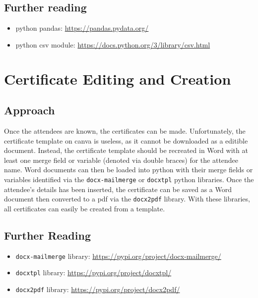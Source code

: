 \documentclass[11pt]{article}
\begin{document}
\subsection{Further reading}

\begin{itemize}
    \item \Gls{python} pandas: \url{https://pandas.pydata.org/}
    \item \Gls{python} \acrshort{csv} module: \url{https://docs.python.org/3/library/csv.html}
\end{itemize}

\newpage

\section{Certificate Editing and Creation}

\subsection{Approach}

Once the attendees are known, the certificates can be made. Unfortunately, the certificate template on \Gls{canva} is useless, as it cannot be downloaded as a editible document. Instead, the certificate template should be recreated in Word with at least one merge field or variable (denoted via double braces) for the attendee name. Word documents can then be loaded into \Gls{python} with their merge fields or variables identified via the \texttt{docx-mailmerge} or \texttt{docxtpl} \Gls{python} libraries. Once the attendee's details has been inserted, the certificate can be saved as a Word document then converted to a \acrshort{pdf} via the \texttt{docx2pdf} \gls{library}. With these libraries, all certificates can easily be created from a template.

\subsection{Further Reading}

\begin{itemize}
    \item \texttt{docx-mailmerge} \gls{library}: \url{https://pypi.org/project/docx-mailmerge/}
    \item \texttt{docxtpl} \gls{library}: \url{https://pypi.org/project/docxtpl/}
    \item \texttt{docx2pdf} \gls{library}: \url{https://pypi.org/project/docx2pdf/}
\end{itemize}
\end{document}

